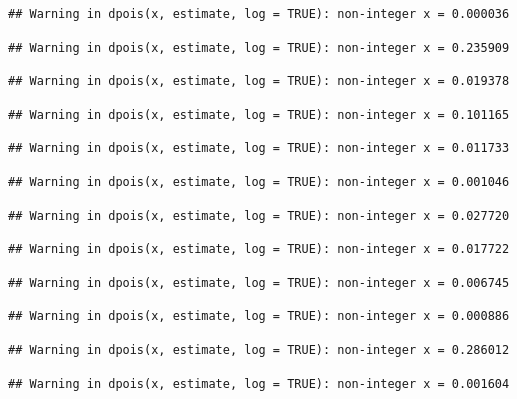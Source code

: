 \documentclass[]{article}
\begin{document}
\begin{verbatim}
## Warning in dpois(x, estimate, log = TRUE): non-integer x = 0.000036
\end{verbatim}

\begin{verbatim}
## Warning in dpois(x, estimate, log = TRUE): non-integer x = 0.235909
\end{verbatim}

\begin{verbatim}
## Warning in dpois(x, estimate, log = TRUE): non-integer x = 0.019378
\end{verbatim}

\begin{verbatim}
## Warning in dpois(x, estimate, log = TRUE): non-integer x = 0.101165
\end{verbatim}

\begin{verbatim}
## Warning in dpois(x, estimate, log = TRUE): non-integer x = 0.011733
\end{verbatim}

\begin{verbatim}
## Warning in dpois(x, estimate, log = TRUE): non-integer x = 0.001046
\end{verbatim}

\begin{verbatim}
## Warning in dpois(x, estimate, log = TRUE): non-integer x = 0.027720
\end{verbatim}

\begin{verbatim}
## Warning in dpois(x, estimate, log = TRUE): non-integer x = 0.017722
\end{verbatim}

\begin{verbatim}
## Warning in dpois(x, estimate, log = TRUE): non-integer x = 0.006745
\end{verbatim}

\begin{verbatim}
## Warning in dpois(x, estimate, log = TRUE): non-integer x = 0.000886
\end{verbatim}

\begin{verbatim}
## Warning in dpois(x, estimate, log = TRUE): non-integer x = 0.286012
\end{verbatim}

\begin{verbatim}
## Warning in dpois(x, estimate, log = TRUE): non-integer x = 0.001604
\end{verbatim}
\end{document}
